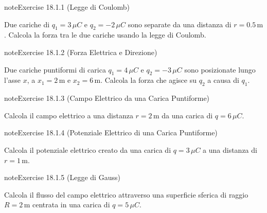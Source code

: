 \documentclass[letterpaper,10pt,italian]{jupyterBook}
\begin{document}
\begin{sphinxadmonition}{note}{Exercise 18.1.1 (Legge di Coulomb)}



\sphinxAtStartPar
Due cariche di \(q_1 = 3 \, \mu C\) e \(q_2 = -2 \, \mu C\) sono separate da una distanza di \(r = 0.5 \, \text{m}\). Calcola la forza tra le due cariche usando la legge di Coulomb.
\end{sphinxadmonition}
 \label{exercise:ch/electromagnetism/electrostatics-problems-exercise-1}

\begin{sphinxadmonition}{note}{Exercise 18.1.2 (Forza Elettrica e Direzione)}



\sphinxAtStartPar
Due cariche puntiformi di carica \(q_1 = 4 \, \mu C\) e \(q_2 = -3 \, \mu C\) sono posizionate lungo l’asse \(x\), a \(x_1 = 2 \, \text{m}\) e \(x_2 = 6 \, \text{m}\). Calcola la forza che agisce su \(q_2\) a causa di \(q_1\).
\end{sphinxadmonition}
 \label{exercise:ch/electromagnetism/electrostatics-problems-exercise-2}

\begin{sphinxadmonition}{note}{Exercise 18.1.3 (Campo Elettrico da una Carica Puntiforme)}



\sphinxAtStartPar
Calcola il campo elettrico a una distanza \(r = 2 \, \text{m}\) da una carica di \(q = 6 \, \mu C\).
\end{sphinxadmonition}
 \label{exercise:ch/electromagnetism/electrostatics-problems-exercise-3}

\begin{sphinxadmonition}{note}{Exercise 18.1.4 (Potenziale Elettrico di una Carica Puntiforme)}



\sphinxAtStartPar
Calcola il potenziale elettrico creato da una carica di \(q = 3 \, \mu C\) a una distanza di \(r = 1 \, \text{m}\).
\end{sphinxadmonition}
 \label{exercise:ch/electromagnetism/electrostatics-problems-exercise-4}

\begin{sphinxadmonition}{note}{Exercise 18.1.5 (Legge di Gauss)}



\sphinxAtStartPar
Calcola il flusso del campo elettrico attraverso una superficie sferica di raggio \(R = 2 \, \text{m}\) centrata in una carica di \(q = 5 \, \mu C\).
\end{sphinxadmonition}
 \label{exercise:ch/electromagnetism/electrostatics-problems-exercise-5}
\end{document}
